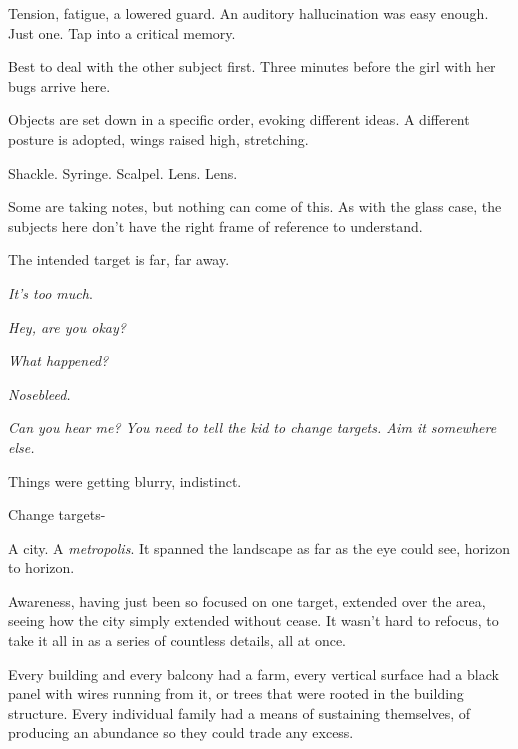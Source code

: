 Tension, fatigue, a lowered guard.  An auditory hallucination was easy enough.  Just one.  Tap into a critical memory.



Best to deal with the other subject first.  Three minutes before the girl with her bugs arrive here.



Objects are set down in a specific order, evoking different ideas.  A different posture is adopted, wings raised high, stretching.



Shackle.  Syringe.  Scalpel.  Lens.  Lens.



Some are taking notes, but nothing can come of this.  As with the glass case, the subjects here don't have the right frame of reference to understand.



The intended target is far, far away.



\emph{It's too much}.



\emph{Hey, are you okay?}



\emph{What happened?}



\emph{Nosebleed.}



\emph{Can you hear me?  You need to tell the kid to change targets.  Aim it somewhere else.}



Things were getting blurry, indistinct.



Change targets-



\sectionbreak



A city.  A \emph{metropolis}.  It spanned the landscape as far as the eye could see, horizon to horizon.



Awareness, having just been so focused on one target, extended over the area, seeing how the city simply extended without cease.  It wasn't hard to refocus, to take it all in as a series of countless details, all at once.



Every building and every balcony had a farm, every vertical surface had a black panel with wires running from it, or trees that were rooted in the building structure.  Every individual family had a means of sustaining themselves, of producing an abundance so they could trade any excess.



